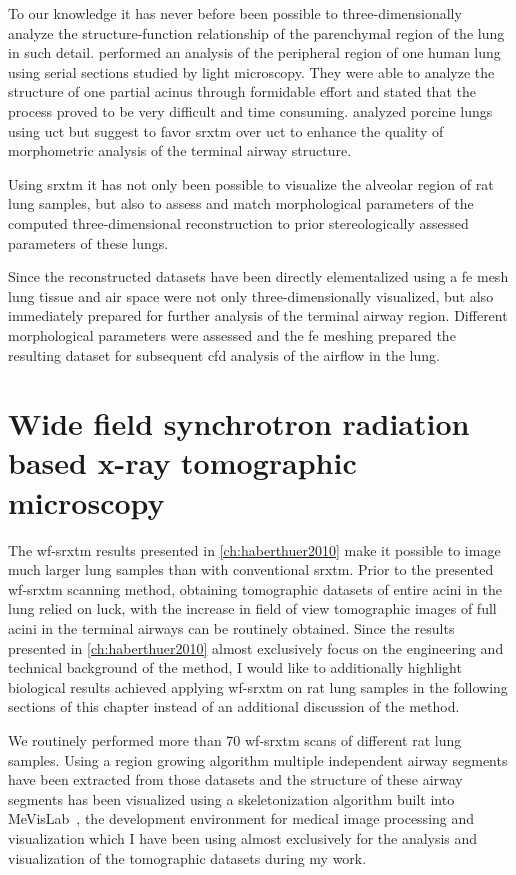 To our knowledge it has never before been possible to three-dimensionally analyze the structure-function relationship of the parenchymal region of the lung in such detail. \citet{Berend1991} performed an analysis of the peripheral region of one human lung using serial sections studied by light microscopy. They were able to analyze the structure of one partial acinus through formidable effort and stated that the process proved to be very difficult and time consuming. \citet{Litzlbauer2006} analyzed porcine lungs using \ac{uct} but suggest to favor \ac{srxtm} over \ac{uct} to enhance the quality of morphometric analysis of the terminal airway structure.

Using \ac{srxtm} it has not only been possible to visualize the alveolar region of rat lung samples, but also to assess and match morphological parameters of the computed three-dimensional reconstruction to prior stereologically assessed parameters of these lungs.

Since the reconstructed datasets have been directly elementalized using a \ac{fe} mesh lung tissue and air space were not only three-dimensionally visualized, but also immediately prepared for further analysis of the terminal airway region. Different morphological parameters were assessed and the \ac{fe} meshing prepared the resulting dataset for subsequent \ac{cfd} analysis of the airflow in the lung.

\section[WF-SRXTM]{Wide field synchrotron radiation based x-ray tomographic microscopy}
The \ac{wf-srxtm} results presented in \autoref{ch:haberthuer2010} make it possible to image much larger lung samples than with conventional \ac{srxtm}. Prior to the presented \ac{wf-srxtm} scanning method, obtaining tomographic datasets of entire acini in the lung relied on luck, with the increase in field of view tomographic images of full acini in the terminal airways can be routinely obtained. Since the results presented in \autoref{ch:haberthuer2010} almost exclusively focus on the engineering and technical background of the method, I would like to additionally highlight biological results achieved applying \ac{wf-srxtm} on rat lung samples in the following sections of this chapter instead of an additional discussion of the method.

We routinely performed more than 70 \ac{wf-srxtm} scans of different rat lung samples. Using a region growing algorithm multiple independent airway segments have been extracted from those datasets and the structure of these airway segments has been visualized using a skeletonization algorithm built into MeVisLab~\cite{Bitter2007}, the development environment for medical image processing and visualization which I have been using almost exclusively for the analysis and visualization of the tomographic datasets during my work.


